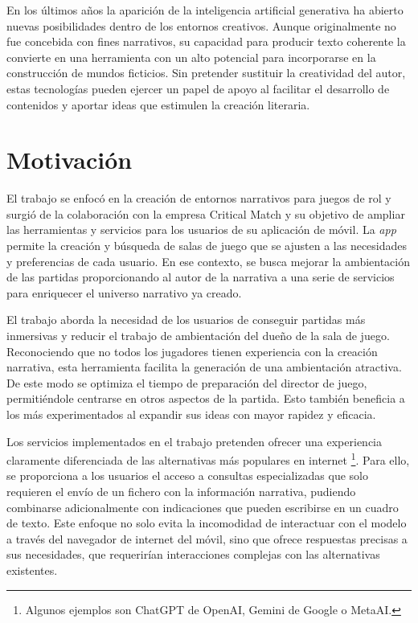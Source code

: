 En los últimos años la aparición de la inteligencia artificial generativa ha abierto nuevas posibilidades
dentro de los entornos creativos.
Aunque originalmente no fue concebida con fines narrativos, su capacidad para producir texto coherente
la convierte en una herramienta con un alto potencial para incorporarse en la construcción de mundos ficticios.
Sin pretender sustituir la creatividad del autor, estas tecnologías pueden ejercer un papel de apoyo
al facilitar el desarrollo de contenidos y aportar ideas que estimulen la creación literaria.


\section{Motivación}
El trabajo se enfocó en la creación de entornos narrativos para juegos de rol 
y surgió de la colaboración con la empresa Critical Match \cite{crit_match_web} y su objetivo de ampliar las herramientas 
y servicios para los usuarios de su aplicación de móvil.
La \textit{app} \cite{crit_match_app} permite la creación y búsqueda de salas de juego que se ajusten a las necesidades y preferencias de cada usuario.
En ese contexto, se busca mejorar la ambientación de las partidas proporcionando al autor de la narrativa a una serie de servicios
para enriquecer el universo narrativo ya creado.

El trabajo aborda la necesidad de los usuarios de conseguir partidas más inmersivas
y reducir el trabajo de ambientación del dueño de la sala de juego.
Reconociendo que no todos los jugadores tienen experiencia con la creación narrativa,
esta herramienta facilita la generación de una ambientación atractiva.
De este modo se optimiza el tiempo de preparación del director de juego, permitiéndole centrarse en otros aspectos de la partida.
Esto también beneficia a los más experimentados al expandir sus ideas con mayor rapidez y eficacia.

Los servicios implementados en el trabajo pretenden ofrecer una experiencia claramente diferenciada de las alternativas más populares en internet
\footnote{Algunos ejemplos son ChatGPT de OpenAI, Gemini de Google o MetaAI.}.
Para ello, se proporciona a los usuarios el acceso a consultas especializadas que solo requieren el envío de un fichero
con la información narrativa, pudiendo combinarse adicionalmente con indicaciones que pueden escribirse en un cuadro de texto.
Este enfoque no solo evita la incomodidad de interactuar con el modelo a través del navegador de internet del móvil,
sino que ofrece respuestas precisas a sus necesidades, que requerirían interacciones complejas
con las alternativas existentes.

